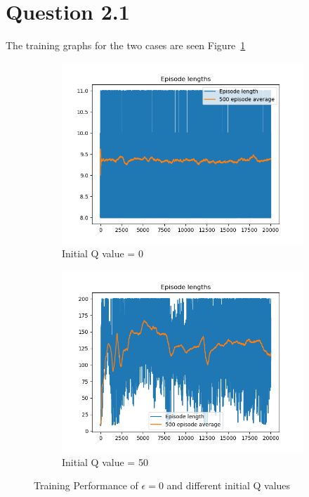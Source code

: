 \documentclass[a4paper]{article}
\begin{document}
\section*{Question 2.1}
The training graphs for the two cases are seen Figure~\ref{fig-init-q}
\begin{figure}[h!]
    \centering
    \begin{subfigure}[b]{0.4\textwidth}
        \centering
        \includegraphics[width=\textwidth]{epsilon_0_init_0.png}
        \caption{Initial Q value = 0}        
    \end{subfigure}
    \begin{subfigure}[b]{0.4\textwidth}
        \centering
        \includegraphics[width=\textwidth]{epsilon_0_init_50.png}
        \caption{Initial Q value = 50}        
    \end{subfigure}
    \caption{Training Performance of $\epsilon=0$ and different initial Q values}
    \label{fig-init-q}
\end{figure}
\end{document}
